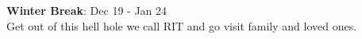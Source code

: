 \documentclass[9pt]{extarticle} %
\begin{document}
\begin{minipage}[t]{.30\linewidth}
\begin{mdframed}[style=sidebar,frametitle={}]
\item \textbf{Winter Break}: Dec 19 - Jan 24 \\
	Get out of this hell hole we call RIT and go visit family and loved 
	ones.





\end{mdframed}
\end{minipage}\hfill %
%
%
\end{document}
